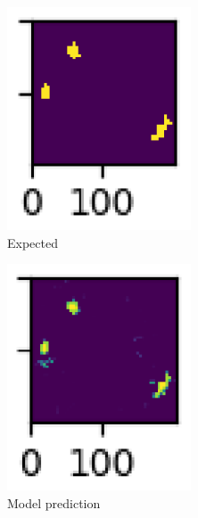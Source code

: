 \documentclass{article}
\begin{document}
\begin{figure}[ht]
  \begin{subfigure}{0.25\textwidth}
    \includegraphics[width=0.6\textwidth]{pixel-mask-seg.png}
    \centering
    \caption{Expected}
  \end{subfigure}%
  \begin{subfigure}{0.25\textwidth}
    \includegraphics[width=0.6\textwidth]{pixel-mask-pred.png}
    \centering
    \caption{Model prediction}
  \end{subfigure}%
  \begin{subfigure}{0.25\textwidth}

\end{subfigure}
\end{figure}
\end{document}
